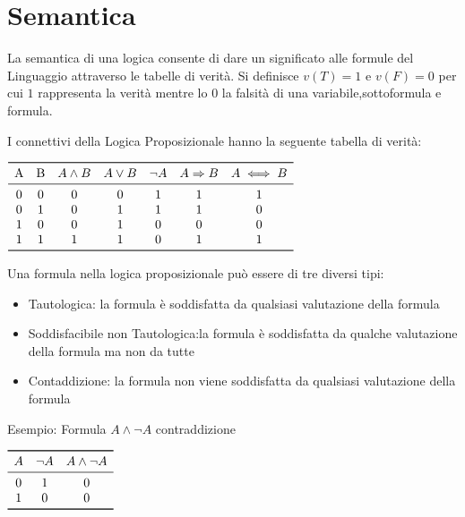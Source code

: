 \section{Semantica}
La semantica di una logica consente di dare un significato alle formule del Linguaggio
attraverso le tabelle di verità.\newline
Si definisce $v(T) = 1$ e $v(F) = 0$ per cui $1$ rappresenta la verità mentre lo $0$
la falsità di una variabile,sottoformula e formula.

I connettivi della Logica Proposizionale hanno la seguente tabella di verità:\newline

$\begin{array}{ccccccc}
\toprule
\text{A} & \text{B} & A \land B & A \lor B & \neg A & A \Rightarrow B & A \iff B \\
\midrule
    0 & 0 & 0 & 0 & 1 & 1 & 1 \\
    0 & 1 & 0 & 1 & 1 & 1 & 0 \\
    1 & 0 & 0 & 1 & 0 & 0 & 0 \\
    1 & 1 & 1 & 1 & 0 & 1 & 1 \\
\bottomrule
\end{array}$\newline

Una formula nella logica proposizionale può essere di tre diversi tipi:

\begin{itemize}
  \item Tautologica: la formula è soddisfatta da qualsiasi valutazione della formula
  \item Soddisfacibile non Tautologica:la formula è soddisfatta da qualche valutazione
        della formula ma non da tutte
  \item Contaddizione: la formula non viene soddisfatta da qualsiasi valutazione della formula
\end{itemize}

Esempio:\newline
Formula $A \land \neg A$ \quad contraddizione

$\begin{array}{ccc}
\toprule A & \neg A & A \land \neg A \\
\midrule
        0 & 1 & 0 \\
        1 & 0 & 0 \\
\bottomrule
\end{array}$\newpage

